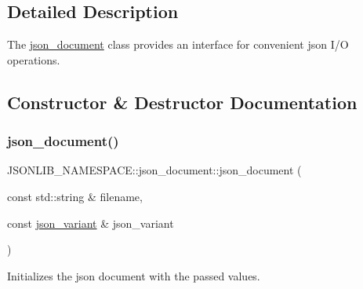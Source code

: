 \subsection{Detailed Description}
The \hyperlink{classJSONLIB__NAMESPACE_1_1json__document}{json\+\_\+document} class provides an interface for convenient json I/O operations. 

\subsection{Constructor \& Destructor Documentation}
\mbox{\label{classJSONLIB__NAMESPACE_1_1json__document_abf4e22f3453ec9856f58a202dae0c836}} 
\subsubsection{\texorpdfstring{json\+\_\+document()}{json\_document()}\hspace{0.1cm}{\footnotesize\ttfamily [1/3]}}
{\footnotesize\ttfamily J\+S\+O\+N\+L\+I\+B\+\_\+\+N\+A\+M\+E\+S\+P\+A\+C\+E\+::json\+\_\+document\+::json\+\_\+document (\begin{DoxyParamCaption}\item[{const std\+::string \&}]{filename,  }\item[{const \hyperlink{classJSONLIB__NAMESPACE_1_1json__variant}{json\+\_\+variant} \&}]{json\+\_\+variant }\end{DoxyParamCaption})}



Initializes the json document with the passed values. 



